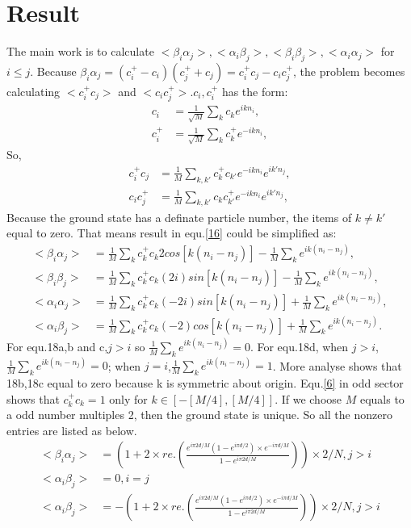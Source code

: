 \documentclass[UTF8]{ctexart}
\begin{document}
\section{Result}
The main work is to calculate $<\beta_i\alpha_j>,<\alpha_i\beta_j>,<\beta_i\beta_j>,<\alpha_i\alpha_j>$ for $i\le j$. Because $\beta_i\alpha_j=(c_i^+-c_i)(c_j^++c_j)=c_i^+c_j-c_ic_j^+$, the problem becomes calculating $<c_i^+c_j>$ and $<c_ic_j^+>$.${c_i,c_i^+}$ has the form:
\begin{subequations}
\begin{align}
\label{15}
c_i&=\frac{1}{\sqrt{M}}\sum_{k}c_ke^{ikn_i},\\
c_i^+&=\frac{1}{\sqrt{M}}\sum_{k}c_k^+e^{-ikn_i},
\end{align}
\end{subequations}
So,
\begin{subequations}
\begin{align}
\label{16}
c_i^+c_j&=\frac{1}{M}\sum_{k,k'}c_k^+c_{k'}e^{-ikn_i}e^{ik'n_j},\\
c_ic_j^+&=\frac{1}{M}\sum_{k,k'}c_kc_{k'}^+e^{-ikn_i}e^{ik'n_j},
\end{align}
\end{subequations}
Because the ground state has a definate particle number, the items of $k\ne k'$ equal to zero. That means result in equ.\ref{16} could be simplified as:
\begin{subequations}
\begin{align}
\label{16}
<\beta_i\alpha_j>&=\frac{1}{M}\sum_{k}c_k^+c_k2cos[k(n_i-n_j)]-\frac{1}{M}\sum_{k}e^{ik(n_i-n_j)},\\
<\beta_i\beta_j>&=\frac{1}{M}\sum_{k}c_k^+c_k(2i)sin[k(n_i-n_j)]-\frac{1}{M}\sum_{k}e^{ik(n_i-n_j)},\\
<\alpha_i\alpha_j>&=\frac{1}{M}\sum_{k}c_k^+c_k(-2i)sin[k(n_i-n_j)]+\frac{1}{M}\sum_{k}e^{ik(n_i-n_j)},\\
<\alpha_i\beta_j>&=\frac{1}{M}\sum_{k}c_k^+c_k(-2)cos[k(n_i-n_j)]+\frac{1}{M}\sum_{k}e^{ik(n_i-n_j)}.
\end{align}
\end{subequations}
For equ.18a,b and c,$j>i$ so $\frac{1}{M}\sum_{k}e^{ik(n_i-n_j)}=0$. For equ.18d, when $j>i$, $\frac{1}{M}\sum_{k}e^{ik(n_i-n_j)}=0$; when $j=i$,$\frac{1}{M}\sum_{k}e^{ik(n_i-n_j)}=1$. More analyse shows that 18b,18c equal to zero because k is symmetric about origin. Equ.\ref{6} in odd sector shows that $c_k^+c_k=1$ only for $k\in[-[M/4],[M/4]]$. If we choose $M$ equals to a odd number multiples 2, then the ground state is unique. So all the nonzero entries are listed as below.
\begin{subequations}
\begin{align}
\label{19}
<\beta_i\alpha_j>&=(1+2\times re.(\frac{e^{i\pi 2d/M}(1-e^{i\pi d/2})\times e^{-i\pi d/M}}{1-e^{i\pi 2d/M}}))\times 2/N, j>i\\
<\alpha_i\beta_j>&=0, i=j\\
<\alpha_i\beta_j>&=-(1+2\times re.(\frac{e^{i\pi 2d/M}(1-e^{i\pi d/2})\times e^{-i\pi d/M}}{1-e^{i\pi 2d/M}}))\times 2/N, j>i
\end{align}
\end{subequations}
\end{document}
